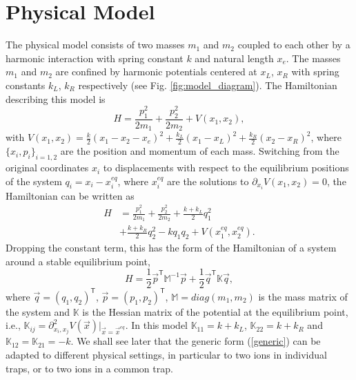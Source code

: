 \section{Physical Model \label{sec:Physical_Model}}
%
%
%
%
The physical model consists of two masses $m_1$ and $m_2$ coupled to each other by a harmonic interaction with spring constant $k$ and natural length $x_e$. The masses $m_1$ and $m_2$ are confined by  harmonic potentials centered at $x_L$, $x_R$ with spring constants $k_L$, $k_R$  respectively (see Fig. \ref{fig:model_diagram}). The Hamiltonian describing this model is
%
\begin{equation}
  H = \frac{p_1^2}{2m_1} + \frac{p_2^2}{2m_2} + V(x_1,x_2),
  \label{eq:HamiltonianOriginalCordinates}
\end{equation}
%
with $V(x_1,x_2)=\frac{k}{2}\left( x_1 - x_2 - x_e \right)^2 + \frac{k_L}{2}\left( x_1 - x_L \right)^2 + \frac{k_R}{2}\left( x_2 - x_R \right)^2$,  where $\{x_i,p_i\}_{i=1,2}$ are the position and momentum of each mass. Switching from the original coordinates $x_i$ to displacements with respect to the equilibrium positions of the system $q_i = x_i - x_i^{eq}$, where $x_i^{eq}$ are the solutions to $\partial_{x_i}V(x_1,x_2)=0$, the Hamiltonian can be written as
%
\begin{align}
  H &= \frac{p_1^2}{2m_1} + \frac{p_2^2}{2m_2} + \frac{k+k_L}{2}q_1^2\nonumber\\ &+ \frac{k+k_R}{2}q_2^2 - k q_1 q_2 + V(x_1^{eq},x_2^{eq}).
  \label{eq:Hamiltonian}
\end{align}
%
Dropping the constant term, this has the form of  the Hamiltonian of a system around a stable equilibrium point,
%
\begin{equation}
  H = \frac{1}{2} \overrightarrow{p}^\mathsf{T}\mathbb{M}^{-1}\overrightarrow{p} + \frac{1}{2} \overrightarrow{q}^\mathsf{T}\mathbb{K}\overrightarrow{q},
\label{generic}
\end{equation}
%
where $\overrightarrow{q} = \left(q_1,q_2\right)^\mathsf{T}$, $\overrightarrow{p} = \left(p_1,p_2\right)^\mathsf{T}$, $\mathbb{M} = diag(m_1,m_2)$ is the mass matrix of the system and $\mathbb{K}$ is the Hessian matrix of the potential at the equilibrium point, i.e., $\mathbb{K}_{ij} = \partial^2_{x_i,x_j}V(\overrightarrow{x})\Big|_{\overrightarrow{x} = \overrightarrow{x}^{eq}}$. In this model  $\mathbb{K}_{11} = k + k_L$, $\mathbb{K}_{22} = k + k_R$ and $\mathbb{K}_{12} = \mathbb{K}_{21} = -k$.
We shall see later that
the generic form (\ref{generic}) can be adapted to different physical settings, in particular to
two ions in individual traps, or to two ions in a common trap.

